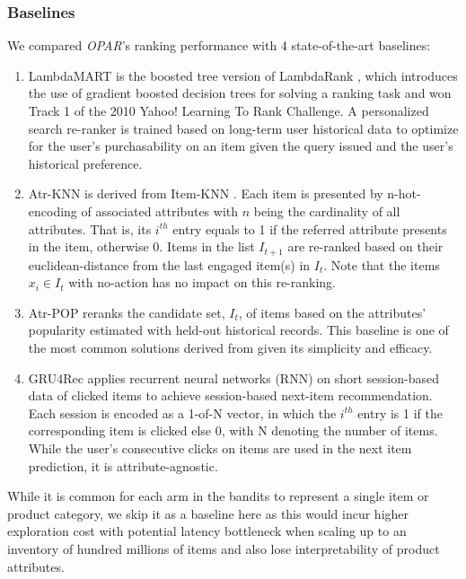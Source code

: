 \documentclass[11pt, dvipdfmx]{article}
\begin{document}
\subsubsection{Baselines} We compared \textit{OPAR}'s ranking performance with 4 state-of-the-art baselines:
\begin{enumerate}
    \item LambdaMART \cite{wu2010adapting} is the boosted tree version of LambdaRank \cite{burges2007learning}, which introduces the use of gradient boosted decision trees for solving a ranking task and won Track 1 of the 2010 Yahoo! Learning To Rank Challenge. A personalized search re-ranker is trained based on long-term user historical data to optimize for the user's purchasability on an item given the query issued and the user's historical preference. 
    \item Atr-KNN is derived from Item-KNN \cite{Hidasi2016SessionbasedRW}. Each item is presented by n-hot-encoding of associated attributes with $n$ being the cardinality of all attributes. That is, its $i^{th}$ entry equals to 1 if the referred attribute presents in the item, otherwise 0. Items in the list $I_{t+1}$ are re-ranked based on their euclidean-distance from the last engaged item(s) in $I_t$. Note that the items $x_i \in I_t$ with no-action has no impact on this re-ranking.
    \item Atr-POP reranks the candidate set, $I_t$,  of items based on the attributes' popularity estimated with held-out historical records. This baseline is one of the most common solutions derived from \cite{Hidasi2016SessionbasedRW} given its simplicity and efficacy.
    \item GRU4Rec \cite{Hidasi2016SessionbasedRW} applies recurrent neural networks (RNN) on short session-based data of clicked items to achieve session-based next-item recommendation. Each session is encoded as a 1-of-N vector, in which the $i^{th}$ entry is 1 if the corresponding item is clicked else 0, with N denoting the number of items. 
    While the user's consecutive clicks on items are used in the next item prediction, it is attribute-agnostic. 
\end{enumerate}

While it is common for each arm in the bandits to represent a single item or product category, we skip it as a baseline here as this would incur higher exploration cost with potential latency bottleneck when scaling up to an inventory of hundred millions of items and also lose interpretability of product attributes. 
\end{document}

